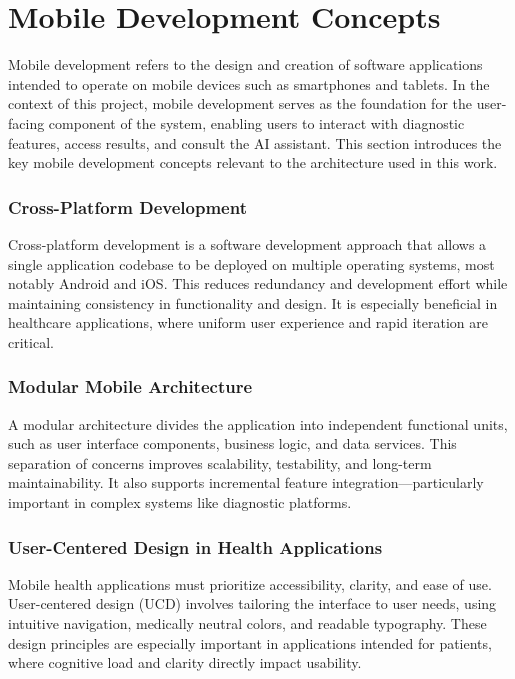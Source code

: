 \section{Mobile Development Concepts}
\label{sec:mobile_concepts}

Mobile development refers to the design and creation of software applications intended to operate on mobile devices such as smartphones and tablets. In the context of this project, mobile development serves as the foundation for the user-facing component of the system, enabling users to interact with diagnostic features, access results, and consult the AI assistant. This section introduces the key mobile development concepts relevant to the architecture used in this work.

\subsubsection*{Cross-Platform Development}

Cross-platform development is a software development approach that allows a single application codebase to be deployed on multiple operating systems, most notably Android and iOS. This reduces redundancy and development effort while maintaining consistency in functionality and design. It is especially beneficial in healthcare applications, where uniform user experience and rapid iteration are critical.

\subsubsection*{Modular Mobile Architecture}

A modular architecture divides the application into independent functional units, such as user interface components, business logic, and data services. This separation of concerns improves scalability, testability, and long-term maintainability. It also supports incremental feature integration—particularly important in complex systems like diagnostic platforms.

\subsubsection*{User-Centered Design in Health Applications}

Mobile health applications must prioritize accessibility, clarity, and ease of use. User-centered design (UCD) involves tailoring the interface to user needs, using intuitive navigation, medically neutral colors, and readable typography. These design principles are especially important in applications intended for patients, where cognitive load and clarity directly impact usability.

